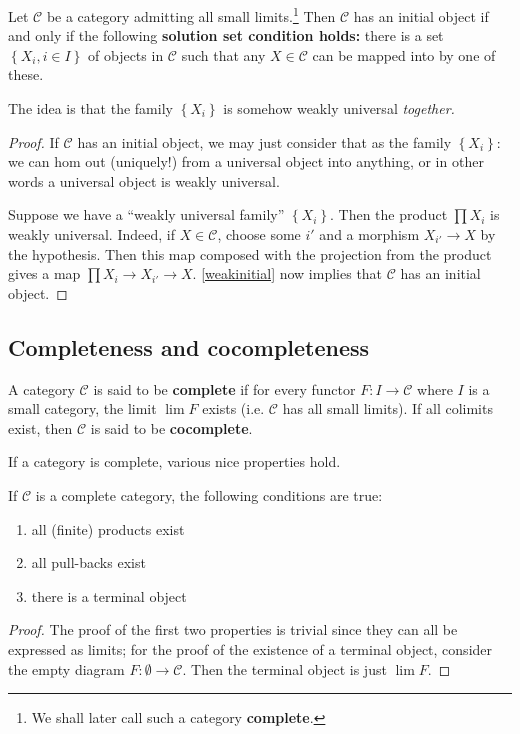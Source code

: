 \begin{theorem}[Freyd]
Let $\mathcal{C}$ be a category admitting all small limits.\footnote{We shall
later call such a category \textbf{complete}.} Then $\mathcal{C}$ has an initial
object if and only if the following \textbf{solution set condition holds:}
there is a set $\left\{X_i, i \in I\right\}$ of objects in $\mathcal{C}$ such
that any $X \in \mathcal{C}$ can be mapped into by one of these.
\end{theorem}

The idea is that the family $\left\{X_i\right\}$ is somehow weakly universal
\emph{together.}
\begin{proof}
If $\mathcal{C}$ has an initial object, we may just consider that as the
family $\left\{X_i\right\}$: we can hom out (uniquely!) from a universal
object into anything, or in other words a universal object is weakly universal.

Suppose we have a ``weakly universal family'' $\left\{X_i\right\}$. Then the
product $\prod X_i$ is weakly universal. Indeed, if $X \in \mathcal{C}$,
choose some $i'$ and a morphism $X_{i'} \to X$ by the hypothesis. Then this map
composed with the projection from the product gives a map  $\prod X_i \to
X_{i'} \to X$.
\cref{weakinitial} now implies that $\mathcal{C}$ has an initial object.
\end{proof}

\subsection{Completeness and cocompleteness}
\begin{definition}\label{completecat} A category $\mathcal{C}$ is said to be \textbf{complete} if for every
functor $F:I\rightarrow \mathcal{C}$ where $I$ is a small category, the limit
$\lim F$ exists (i.e. $\mathcal{C}$ has all small limits). If all colimits exist, then $\mathcal{C}$ is said to be
\textbf{cocomplete}.
\end{definition}

If a category is complete, various nice properties hold.
\begin{proposition} If $\mathcal{C}$ is a complete category, the following
conditions are true:
\begin{enumerate}
\item{all (finite) products exist}
\item{all pull-backs exist}
\item{there is a terminal object}
\end{enumerate}
\end{proposition}
\begin{proof} The proof of the first two properties is trivial since they can
all be expressed as limits; for the proof of the existence of a terminal
object, consider the empty diagram $F:\emptyset \rightarrow \mathcal{C}$. Then
the
terminal object is just $\lim F$.
\end{proof}

